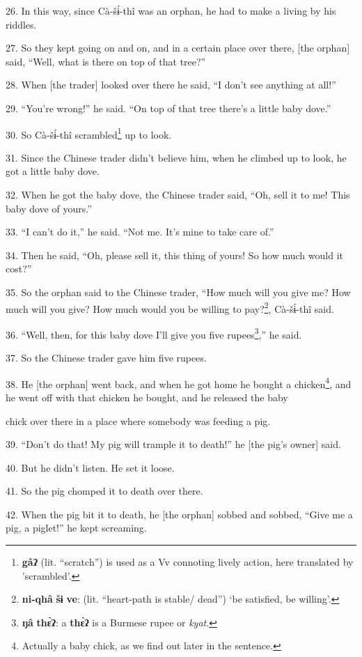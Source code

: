 26. In this way, since Cà-šɨ́-thî was an orphan, he had to make a living by
his riddles.

27. So they kept going on and on, and in a certain place over there, [the orphan]
said, ``Well, what is there on top of that tree?''

28. When [the trader] looked over there he said, ``I don't see anything at all!''

29. ``You're wrong!'' he said. ``On top of that tree there's a little baby dove.''

30. So Cà-šɨ́-thî scrambled\footnote{\textbf{gâʔ} (lit. ``scratch'') is used as a Vv connoting lively action, here translated by 'scrambled'.} up to look.

31. Since the Chinese trader didn't believe him, when he climbed up to look, he
got a little baby dove.

32. When he got the baby dove, the Chinese trader said, ``Oh, sell it to me! This
baby dove of yours.''

33. ``I can't do it,'' he said. ``Not me. It's mine to take care of.''

34. Then he said, ``Oh, please sell it, this thing of yours! So how much would
it cost?''

35. So the orphan said to the Chinese trader, ``How much will you give me? How much
will you give? How much would you be willing to pay?\footnote{\textbf{ni-qhâ} \textbf{šɨ} \textbf{ve}: (lit. ``heart-path is stable/ dead'') `be satisfied, be willing'.}, Cà-šɨ́-thî said.

36. ``Well, then, for this baby dove I'll give you five rupees\footnote{\textbf{ŋâ} \textbf{thɛ̀ʔ}: a \textbf{thɛ̀ʔ} is a Burmese rupee or \textit{kyat}.},'' he said.

37. So the Chinese trader gave him five rupees.

38. He [the orphan] went back, and when he got home he bought a chicken\footnote{Actually a baby chick, as we find out later in the sentence.}, and
he went off with that chicken he bought, and he released the baby

chick over there in a place where somebody was feeding a pig.

39. ``Don't do that! My pig will trample it to death!'' he [the pig's owner] said.

40. But he didn't listen. He set it loose.

41. So the pig chomped it to death over there.

42. When the pig bit it to death, he [the orphan] sobbed and sobbed, ``Give me
a pig, a piglet!'' he kept screaming.

